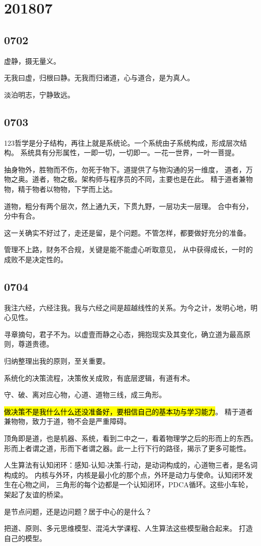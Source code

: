 \section{201807}

\subsection{0702}

虚静，摄无量义。

无我曰虚，归根曰静。无我而归诸道，心与道合，是为真人。

淡泊明志，宁静致远。

\subsection{0703}

123哲学是分子结构，再往上就是系统论。一个系统由子系统构成，形成层次结构。
系统具有分形属性，一即一切，一切即一。一花一世界，一叶一菩提。

抽身物外，胜物而不伤，勿死于物下。道提供了与物沟通的另一维度，
道者，万物之奥。道者，物之极。架构师与程序员的不同，主要也是在此。
精于道者兼物物，精于物者以物物，下学而上达。

道物，粗分有两个层次，然上通九天，下贯九野，一层功夫一层理。
合中有分，分中有合。

这一关确实不好过了，走还是留，是个问题。不管怎样，都要做好充分的准备。

管理不上路，财务不合规，关键是能不能虚心听取意见，
从中获得成长，一时的成败不是决定性的。

\subsection{0704}

我注六经，六经注我。我与六经之间是超越线性的关系。为今之计，发明心地，明心见性。

寻章摘句，君子不为。以虚壹而静之心态，拥抱现实及其变化，确立道为最高原则，尊道贵德。

归纳整理出我的原则，至关重要。

系统化的决策流程，决策攸关成败，有底层逻辑，有道有术。

守、破、离对应心物，心道、道物三线，成三角形。

\hl{做决策不是我什么什么还没准备好，要相信自己的基本功与学习能力}。
精于道者兼物物，致力于道，物不会是严重障碍。

顶角即是道，也是机器、系统，看到二中之一，看着物理学之后的形而上的东西。
形而上者谓之道，形而下者谓之器。此一上行下行的路径，揭示了更多可能性。

人生算法有认知闭环：感知-认知-决策-行动，是动词构成的，心道物三者，是名词构成的。
内核与外环，内核是最小化的那个点，外环是动力与使命。认知闭环发生在心物之间，
三角形的每个边都是一个认知闭环，PDCA循环。这些小车轮，架起了友谊的桥梁。

是节点问题，还是边问题？居于中心的是什么？

把道、原则、多元思维模型、混沌大学课程、人生算法这些模型融合起来。
打造自己的模型。
